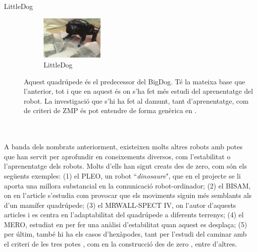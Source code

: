 \documentclass[12pt,a4paper,final,twoside]{article}
\begin{document}
\begin{description}
\item[LittleDog]
\begin{minipage}[t]{0.94\linewidth}
	\begin{figure}
	    \centering
		\includegraphics[width=0.30\textwidth]{Imatges/LittleDog}
                \caption{LittleDog \cite{Kalakrishnan2010}}
     \end{figure}
 Aquest quadrúpede és el predecessor del BigDog. Té la mateixa base que l'anterior, tot i que en aquest és on s'ha fet més estudi del aprenentatge del robot. La investigació que s'hi ha fet al damunt, tant d'aprenentatge, com de criteri de ZMP és pot entendre de forma genèrica en \cite{Kalakrishnan2010}. 
\end{minipage}\\

\end{description}


\paragraph{}A banda dels nombrats anteriorment, existeixen molts altres robots amb potes que han servit per aprofundir en coneixements diversos, com l'estabilitat o l'aprenentatge dels robots. Molts d'ells han sigut creats des de zero, com són els següents exemples: (1) el PLEO, un robot ``\textit{dinosaure}", que en el projecte \cite{Menendez2011} se li aporta una millora substancial en la comunicació robot-ordinador; (2) el BISAM, on en l'article \cite{Albiez2003} s'estudia com provocar que els moviments siguin més semblants als d'un mamífer quadrúpede; (3) el MRWALL-SPECT IV, on l'autor d'aquests articles \cite{Loc2010} i \cite{Loc2011} es centra en l'adaptabilitat del quadrúpede a diferents terrenys; (4) el MERO, estudiat en \cite{Ion} per fer una anàlisi d'estabilitat quan aquest es desplaça; (5) per últim, també hi ha els casos d'hexàpodes, tant per l'estudi del caminar amb el criteri de les tres potes \cite{Lee1988}, com en la construcció des de zero \cite{Lojo2009}, entre d'altres. 
\end{document}
